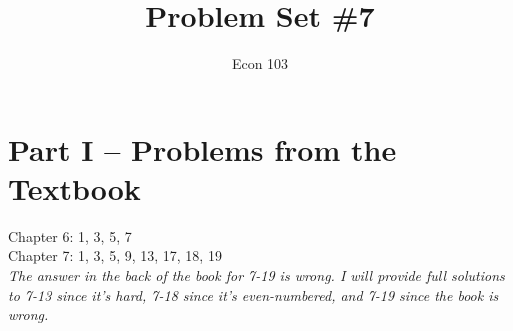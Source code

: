 \documentclass[addpoints,12pt]{exam}\usepackage[]{graphicx}\usepackage[]{color}
\title{Problem Set \#7}
\author{Econ 103}
\date{}
\begin{document}
\maketitle


\section*{Part I -- Problems from the Textbook}
Chapter 6: 1, 3, 5, 7\\
Chapter 7: 1, 3, 5, 9, 13, 17, 18, 19\\

\noindent\emph{The answer in the back of the book for 7-19 is \emph{wrong}. I will provide full solutions to 7-13 since it's hard, 7-18 since it's even-numbered, and 7-19 since the book is wrong.}
\end{document}
